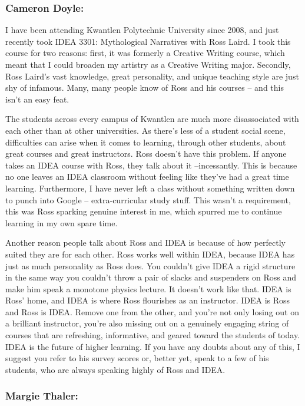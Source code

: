 \documentclass[letterpaper,10pt,headsepline]{scrreprt}
\begin{document}
\subsubsection{Cameron Doyle:}

I have been attending Kwantlen Polytechnic University since 2008, and just
recently took IDEA 3301: Mythological Narratives with Ross Laird. I took
this course for two reasons: first, it was formerly a Creative Writing
course, which meant that I could broaden my artistry as a Creative Writing
major. Secondly, Ross Laird's vast knowledge, great personality, and unique
teaching style are just shy of infamous. Many, many people know of Ross and
his courses -- and this isn't an easy feat.

The students across every campus of Kwantlen are much more disassociated with each other than at other
universities. As there's less of a student social scene, difficulties can
arise when it comes to learning, through other students, about great
courses and great instructors. Ross doesn't have this problem. If anyone
takes an IDEA course with Ross, they talk about it --incessantly. This is
because no one leaves an IDEA classroom without feeling like they've had a
great time learning. Furthermore, I have never left a class without
something written down to punch into Google -- extra-curricular study stuff.
This wasn't a requirement, this was Ross sparking genuine interest in me,
which spurred me to continue learning in my own spare time.

Another reason
people talk about Ross and IDEA is because of how perfectly suited they are
for each other. Ross works well within IDEA, because IDEA has just as much
personality as Ross does. You couldn't give IDEA a rigid structure in the
same way you couldn't throw a pair of slacks and suspenders on Ross and
make him speak a monotone physics lecture. It doesn't work like that. IDEA
is Ross' home, and IDEA is where Ross flourishes as an instructor. IDEA is
Ross and Ross is IDEA. Remove one from the other, and you're not only
losing out on a brilliant instructor, you're also missing out on a
genuinely engaging string of courses that are refreshing, informative, and
geared toward the students of today. IDEA is the future of higher learning.
If you have any doubts about any of this, I suggest you refer to his survey
scores or, better yet, speak to a few of his students, who are always
speaking highly of Ross and IDEA.

\subsubsection{Margie Thaler:}
\end{document}

